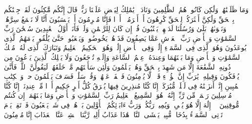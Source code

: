 \startbuffer[\q:43:76]
وَمَا ظَلَمۡنَٰهُمۡ وَلَٰكِن كَانُوا۟ هُمُ ٱلظَّٰلِمِینَ%
\stopbuffer
\startbuffer[\q:43:77]
وَنَادَوۡا۟ یَٰمَٰلِكُ لِیَقۡضِ عَلَیۡنَا رَبُّكَۖ قَالَ إِنَّكُم مَّٰكِثُونَ%
\stopbuffer
\startbuffer[\q:43:78]
لَقَدۡ جِئۡنَٰكُم بِٱلۡحَقِّ وَلَٰكِنَّ أَكۡثَرَكُمۡ لِلۡحَقِّ كَٰرِهُونَ%
\stopbuffer
\startbuffer[\q:43:79]
أَمۡ أَبۡرَمُوۤا۟ أَمۡرࣰا فَإِنَّا مُبۡرِمُونَ%
\stopbuffer
\startbuffer[\q:43:80]
أَمۡ یَحۡسَبُونَ أَنَّا لَا نَسۡمَعُ سِرَّهُمۡ وَنَجۡوَىٰهُمۚ بَلَىٰ وَرُسُلُنَا لَدَیۡهِمۡ یَكۡتُبُونَ%
\stopbuffer
\startbuffer[\q:43:81]
قُلۡ إِن كَانَ لِلرَّحۡمَٰنِ وَلَدࣱ فَأَنَا۠ أَوَّلُ ٱلۡعَٰبِدِینَ%
\stopbuffer
\startbuffer[\q:43:82]
سُبۡحَٰنَ رَبِّ ٱلسَّمَٰوَٰتِ وَٱلۡأَرۡضِ رَبِّ ٱلۡعَرۡشِ عَمَّا یَصِفُونَ%
\stopbuffer
\startbuffer[\q:43:83]
فَذَرۡهُمۡ یَخُوضُوا۟ وَیَلۡعَبُوا۟ حَتَّىٰ یُلَٰقُوا۟ یَوۡمَهُمُ ٱلَّذِی یُوعَدُونَ%
\stopbuffer
\startbuffer[\q:43:84]
وَهُوَ ٱلَّذِی فِی ٱلسَّمَاۤءِ إِلَٰهࣱ وَفِی ٱلۡأَرۡضِ إِلَٰهࣱۚ وَهُوَ ٱلۡحَكِیمُ ٱلۡعَلِیمُ%
\stopbuffer
\startbuffer[\q:43:85]
وَتَبَارَكَ ٱلَّذِی لَهُۥ مُلۡكُ ٱلسَّمَٰوَٰتِ وَٱلۡأَرۡضِ وَمَا بَیۡنَهُمَا وَعِندَهُۥ عِلۡمُ ٱلسَّاعَةِ وَإِلَیۡهِ تُرۡجَعُونَ%
\stopbuffer
\startbuffer[\q:43:86]
وَلَا یَمۡلِكُ ٱلَّذِینَ یَدۡعُونَ مِن دُونِهِ ٱلشَّفَٰعَةَ إِلَّا مَن شَهِدَ بِٱلۡحَقِّ وَهُمۡ یَعۡلَمُونَ%
\stopbuffer
\startbuffer[\q:43:87]
وَلَئِن سَأَلۡتَهُم مَّنۡ خَلَقَهُمۡ لَیَقُولُنَّ ٱللَّهُۖ فَأَنَّىٰ یُؤۡفَكُونَ%
\stopbuffer
\startbuffer[\q:43:88]
وَقِیلِهِۦ یَٰرَبِّ إِنَّ هَٰۤؤُلَاۤءِ قَوۡمࣱ لَّا یُؤۡمِنُونَ%
\stopbuffer
\startbuffer[\q:43:89]
فَٱصۡفَحۡ عَنۡهُمۡ وَقُلۡ سَلَٰمࣱۚ فَسَوۡفَ یَعۡلَمُونَ%
\stopbuffer
\startbuffer[\q:44:1]
حمۤ%
\stopbuffer
\startbuffer[\q:44:2]
وَٱلۡكِتَٰبِ ٱلۡمُبِینِ%
\stopbuffer
\startbuffer[\q:44:3]
إِنَّاۤ أَنزَلۡنَٰهُ فِی لَیۡلَةࣲ مُّبَٰرَكَةٍۚ إِنَّا كُنَّا مُنذِرِینَ%
\stopbuffer
\startbuffer[\q:44:4]
فِیهَا یُفۡرَقُ كُلُّ أَمۡرٍ حَكِیمٍ%
\stopbuffer
\startbuffer[\q:44:5]
أَمۡرࣰا مِّنۡ عِندِنَاۤۚ إِنَّا كُنَّا مُرۡسِلِینَ%
\stopbuffer
\startbuffer[\q:44:6]
رَحۡمَةࣰ مِّن رَّبِّكَۚ إِنَّهُۥ هُوَ ٱلسَّمِیعُ ٱلۡعَلِیمُ%
\stopbuffer
\startbuffer[\q:44:7]
رَبِّ ٱلسَّمَٰوَٰتِ وَٱلۡأَرۡضِ وَمَا بَیۡنَهُمَاۤۖ إِن كُنتُم مُّوقِنِینَ%
\stopbuffer
\startbuffer[\q:44:8]
لَاۤ إِلَٰهَ إِلَّا هُوَ یُحۡیِۦ وَیُمِیتُۖ رَبُّكُمۡ وَرَبُّ ءَابَاۤئِكُمُ ٱلۡأَوَّلِینَ%
\stopbuffer
\startbuffer[\q:44:9]
بَلۡ هُمۡ فِی شَكࣲّ یَلۡعَبُونَ%
\stopbuffer
\startbuffer[\q:44:10]
فَٱرۡتَقِبۡ یَوۡمَ تَأۡتِی ٱلسَّمَاۤءُ بِدُخَانࣲ مُّبِینࣲ%
\stopbuffer
\startbuffer[\q:44:11]
یَغۡشَى ٱلنَّاسَۖ هَٰذَا عَذَابٌ أَلِیمࣱ%
\stopbuffer
\startbuffer[\q:44:12]
رَّبَّنَا ٱكۡشِفۡ عَنَّا ٱلۡعَذَابَ إِنَّا مُؤۡمِنُونَ%
